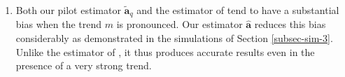 \begin{enumerate}[label=(\alph*),leftmargin=0.7cm]
\item Both our pilot estimator $\widetilde{\boldsymbol{a}}_q$ and the estimator of \cite{Hall2003} tend to have a substantial bias when the trend $m$ is pronounced. Our estimator $\widehat{\boldsymbol{a}}$ reduces this bias considerably as demonstrated in the simulations of Section \ref{subsec-sim-3}. Unlike the estimator of \cite{Hall2003}, it thus produces accurate results even in the presence of a very strong trend. 
\end{enumerate}


